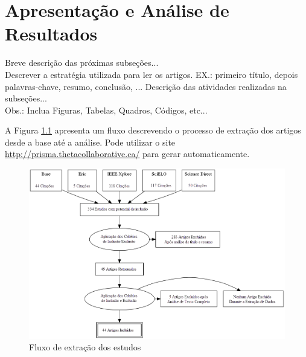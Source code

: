 \chapter{Apresentação e Análise de Resultados}

Breve descrição das próximas subseções...\\

Descrever a estratégia utilizada para ler os artigos. EX.: primeiro título, depois palavras-chave, resumo, conclusão, ...
Descrição das atividades realizadas na subseções...\\
Obs.: Inclua Figuras, Tabelas, Quadros, Códigos, etc...

A Figura \ref{fig:criterios} apresenta um fluxo descrevendo o processo de extração dos artigos desde a base até a análise. Pode utilizar o site \url{http://prisma.thetacollaborative.ca/} para gerar automaticamente.

\begin{figure}[htb]
	\caption{\label{fig:criterios}Fluxo de extração dos estudos}   
	\begin{center}
		\includegraphics[scale=0.7]{Imagens/EstrategiadeBusca.dot.png}
	\end{center}
\end{figure}